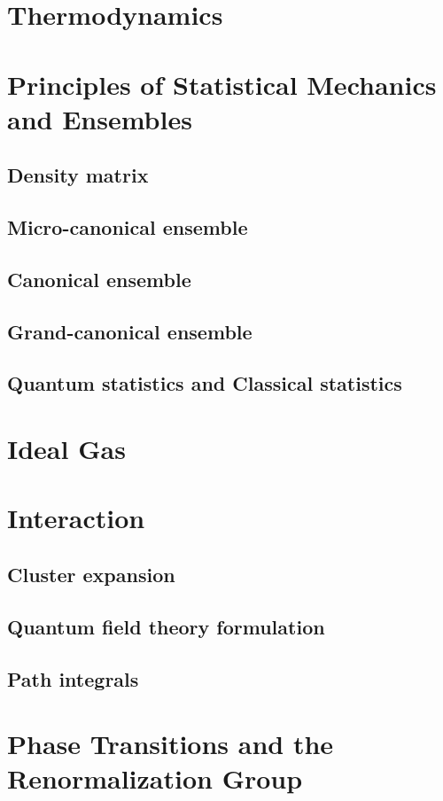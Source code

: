 \chapter{Thermodynamics}

\chapter{Principles of Statistical Mechanics and Ensembles}
\section{Density matrix}
\section{Micro-canonical ensemble}
\section{Canonical ensemble}
\section{Grand-canonical ensemble}
\section{Quantum statistics and Classical statistics}

\chapter{Ideal Gas}

\chapter{Interaction}
\section{Cluster expansion}
\section{Quantum field theory formulation}
\section{Path integrals}

\chapter{Phase Transitions and the Renormalization Group}